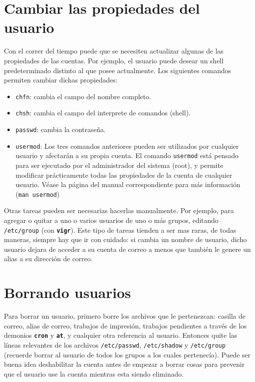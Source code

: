 \documentclass[12pt]{article}
\begin{document}
\section*{Cambiar las propiedades del usuario}
Con el correr del tiempo puede que se necesiten actualizar algunas de las 
propiedades de las cuentas. Por ejemplo, el usuario puede desear un shell 
predeterminado distinto al que posee actualmente. Los siguientes comandos 
permiten cambiar dichas propiedades: 

\begin{itemize}
\item 	\texttt{chfn}:  cambia el campo del nombre completo.
\item 	\texttt{chsh}:  cambia el campo del interprete de comandos (shell).
\item 	\texttt{passwd}: cambia la contraseña. 
\item 	\texttt{usermod}: Los tres comandos anteriores pueden ser utilizados 
por cualquier usuario y afectarán a su propia cuenta. El comando \texttt{usermod}
está pensado para ser ejecutado por el administrador del sistema (root), y 
permite modificar prácticamente todas las propiedades de la cuenta de cualquier 
usuario. Véase la página del manual correspondiente para más información
(\texttt{man usermod})
\end{itemize}


Otras tareas pueden ser necesarias hacerlas manualmente. Por ejemplo,
para agregar o quitar a uno o varios usuarios
de uno o más grupos, editando \texttt{/etc/group} (con
\texttt{\textbf{vigr}}). Este tipo de tareas tienden a ser mas raras, de todas
maneras, siempre hay que ir con cuidado: si cambia un nombre de usuario, dicho
usuario dejara de acceder a su cuenta de correo a menos que también le genere un
alias a su dirección de correo.
	
\section*{Borrando usuarios}

Para borrar un usuario, primero borre los archivos que le pertenezcan:
casilla de correo, alias de correo, trabajos de impresión, trabajos pendientes a
través de los demonios \texttt{\textbf{cron}} y \texttt{\textbf{at}}, y
cualquier otra referencia al usuario.  Entonces quite las 
líneas relevantes de los archivos \texttt{/etc/passwd},  \texttt{/etc/shadow} y
\texttt{/etc/group} (recuerde borrar al usuario de todos los grupos
a los cuales pertenecía).  Puede ser buena idea deshabilitar la cuenta antes de
empezar a borrar cosas para prevenir que el usuario use la cuenta mientras esta
siendo eliminado.
\end{document}
